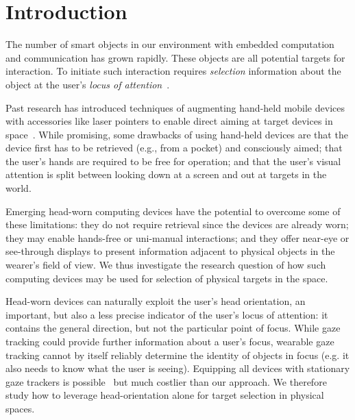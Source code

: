 \section{Introduction}

The number of smart objects in our environment with embedded computation and communication has grown rapidly. These objects are all potential targets for interaction.
To initiate such interaction requires {\em selection} information about the object at the user's {\em locus of attention}~\cite{raskin}. 

Past research has introduced techniques of augmenting hand-held mobile devices with accessories like laser pointers to enable direct aiming at target devices in space~\cite{beigl_point_1999,patel_2-way_2003}. While promising, some drawbacks of using hand-held devices are that the device first has to be retrieved (e.g., from a pocket) and consciously aimed; that the user's hands are required to be free for operation; and that the user's visual attention is split between looking down at a screen and out at targets in the world. 

Emerging head-worn computing devices have the potential to overcome some of these limitations: they do not require retrieval since the devices are already worn; they may enable hands-free or uni-manual interactions; and they offer near-eye or see-through displays to present information adjacent to physical objects in the wearer's field of view. We thus investigate the research question of how such computing devices may be used for selection of physical targets in the space.

Head-worn devices can naturally exploit the user's head orientation, an important, but also a less precise indicator of the user's locus of attention: it contains the general direction, but not the particular point of focus. While gaze tracking could provide further information about a user's focus, wearable gaze tracking cannot by itself reliably determine the identity of objects in focus (e.g. it also needs to know what the user is seeing). Equipping all devices with stationary gaze trackers is possible~\cite{vertegaal2005media} but much costlier than our approach. We therefore study how to leverage head-orientation alone for target selection in physical spaces. 

